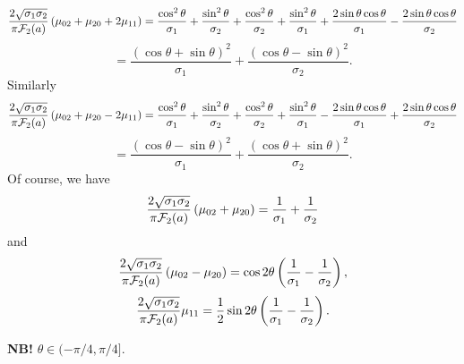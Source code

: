 \documentclass{article}
\begin{document}
\[
	\frac{2\sqrt{\sigma_1\sigma_2}}{\pi\mathcal F_2(a)}\left(\mu_{02}+\mu_{20} + 2\mu_{11}   \right)= \frac{\cos^2\theta}{\sigma_1}+\frac{\sin^2\theta}{\sigma_2}+\frac{\cos^2\theta}{\sigma_2}+\frac{\sin^2\theta}{\sigma_1}+\frac{2\sin\theta\cos\theta}{\sigma_1}-\frac{2\sin\theta\cos\theta}{\sigma_2}
\]
\[
	=\frac{(\cos\theta+\sin\theta)^2}{\sigma_1}+\frac{(\cos\theta-\sin\theta)^2}{\sigma_2}.
\]
Similarly
\[
	\frac{2\sqrt{\sigma_1\sigma_2}}{\pi\mathcal F_2(a)}\left(\mu_{02}+\mu_{20} - 2\mu_{11}   \right)= \frac{\cos^2\theta}{\sigma_1}+\frac{\sin^2\theta}{\sigma_2}+\frac{\cos^2\theta}{\sigma_2}+\frac{\sin^2\theta}{\sigma_1}-\frac{2\sin\theta\cos\theta}{\sigma_1}+\frac{2\sin\theta\cos\theta}{\sigma_2}
\]
\[
	=\frac{(\cos\theta-\sin\theta)^2}{\sigma_1}+\frac{(\cos\theta+\sin\theta)^2}{\sigma_2}.
\]
Of course, we have
\[
	\frac{2\sqrt{\sigma_1\sigma_2}}{\pi\mathcal F_2(a)}\left(\mu_{02}+\mu_{20}    \right)=\frac{1}{\sigma_1}+\frac{1}{\sigma_2}
\]
and
\[
	\frac{2\sqrt{\sigma_1\sigma_2}}{\pi\mathcal F_2(a)}\left(\mu_{02}-\mu_{20}    \right)=\cos2\theta\left(\frac{1}{\sigma_1}-\frac{1}{\sigma_2}\right),
\]
\[
	\frac{2\sqrt{\sigma_1\sigma_2}}{\pi\mathcal F_2(a)}\mu_{11}=\frac{1}{2}\sin2\theta\left(\frac{1}{\sigma_1}-\frac{1}{\sigma_2}\right).
\]

\textbf{NB!} $\theta\in(-\pi/4,\pi/4]$.
\end{document}

